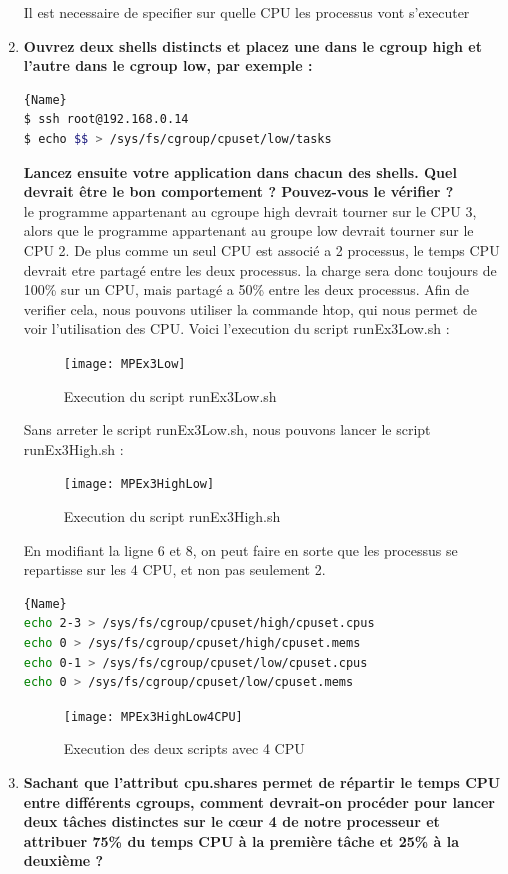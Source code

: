 \documentclass[
	a4paper, %
	10pt, %
]{CSUniSchoolLabReport}
\begin{document}
\begin{enumerate}[label=\textbf{\arabic*}]
	
	Il est necessaire de specifier sur quelle CPU les processus vont s'executer
	\item \textbf{Ouvrez deux shells distincts et placez une dans le cgroup high et l’autre dans le cgroup low, par exemple :}\\
\begin{lstlisting}[language=bash, firstnumber=1]{Name}
$ ssh root@192.168.0.14
$ echo $$ > /sys/fs/cgroup/cpuset/low/tasks
\end{lstlisting}
\textbf{Lancez ensuite votre application dans chacun des shells. Quel devrait être le bon comportement ? Pouvez-vous le vérifier ?}\\
le programme appartenant au cgroupe high devrait tourner sur le CPU 3, alors que le programme appartenant au groupe low devrait tourner sur le CPU 2.
De plus comme un seul CPU est associé a 2 processus, le temps CPU devrait etre partagé entre les deux processus. la charge sera donc toujours de 100\% sur un CPU, mais partagé a 50\% entre les deux processus.
Afin de verifier cela, nous pouvons utiliser la commande htop, qui nous permet de voir l'utilisation des CPU.
Voici l'execution du script runEx3Low.sh :
\begin{figure}[H]
	\centering
	\texttt{[image: MPEx3Low]}
	\caption{Execution du script runEx3Low.sh}
	\label{fig:MPEx3Low}
\end{figure}
Sans arreter le script runEx3Low.sh, nous pouvons lancer le script runEx3High.sh :
\begin{figure}[H]
	\centering
	\texttt{[image: MPEx3HighLow]}
	\caption{Execution du script runEx3High.sh}
	\label{fig:MPEx3High}
\end{figure}

En modifiant la ligne 6 et 8, on peut faire en sorte que les processus se repartisse sur les 4 CPU, et non pas seulement 2.
\begin{lstlisting}[language=bash, firstnumber=1]{Name}
echo 2-3 > /sys/fs/cgroup/cpuset/high/cpuset.cpus
echo 0 > /sys/fs/cgroup/cpuset/high/cpuset.mems
echo 0-1 > /sys/fs/cgroup/cpuset/low/cpuset.cpus
echo 0 > /sys/fs/cgroup/cpuset/low/cpuset.mems
\end{lstlisting}

\begin{figure}[H]
	\centering
	\texttt{[image: MPEx3HighLow4CPU]}
	\caption{Execution des deux scripts avec 4 CPU}
	\label{fig:MPEx3HighLow4CPU}
\end{figure}


	\item \textbf{Sachant que l’attribut cpu.shares permet de répartir le temps CPU entre différents cgroups, comment devrait-on procéder pour lancer deux tâches distinctes sur le cœur 4 de notre processeur et attribuer 75\% du temps CPU à la première tâche et 25\% à la deuxième ?}\\


\end{enumerate}
\end{document}
